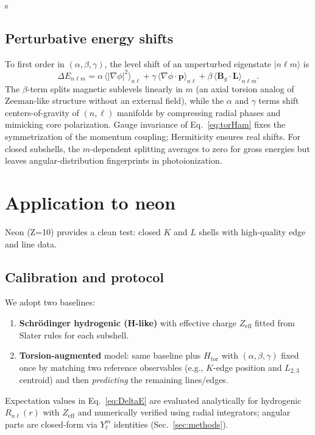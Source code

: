 s\documentclass[12pt]{article}
\begin{document}
\subsection{Perturbative energy shifts}
To first order in $(\alpha,\beta,\gamma)$, the level shift of an unperturbed eigenstate $\lvert n\ell m\rangle$ is
\begin{equation}
\Delta E_{n\ell m} = \alpha\,\big\langle |\nabla \phi|^2 \big\rangle_{n\ell}
+ \gamma\,\big\langle \nabla \phi \cdot \bm{p} \big\rangle_{n\ell}
+ \beta\,\big\langle \bm{B}_g\cdot \bm{L} \big\rangle_{n\ell m}.
\label{eq:DeltaE}
\end{equation}
The $\beta$-term splits magnetic sublevels linearly in $m$ (an axial torsion analog of Zeeman-like structure without an external field), while the $\alpha$ and $\gamma$ terms shift centers-of-gravity of $(n,\ell)$ manifolds by compressing radial phases and mimicking core polarization. Gauge invariance of Eq.~\eqref{eq:torHam} fixes the symmetrization of the momentum coupling; Hermiticity ensures real shifts. For closed subshells, the $m$-dependent splitting averages to zero for gross energies but leaves angular-distribution fingerprints in photoionization.

\section{Application to neon}
Neon (Z=10) provides a clean test: closed $K$ and $L$ shells with high-quality edge and line data.\cite{NISTXray,Chantler,KrauseOliver}

\subsection{Calibration and protocol}
We adopt two baselines:
\begin{enumerate}
\item \textbf{Schrödinger hydrogenic (H-like)} with effective charge $Z_{\mathrm{eff}}$ fitted from Slater rules for each subshell.\cite{Slater}
\item \textbf{Torsion-augmented} model: same baseline plus $H_{\mathrm{tor}}$ with $(\alpha,\beta,\gamma)$ fixed once by matching two reference observables (e.g., $K$-edge position and $L_{2,3}$ centroid) and then \emph{predicting} the remaining lines/edges.
\end{enumerate}
Expectation values in Eq.~\eqref{eq:DeltaE} are evaluated analytically for hydrogenic $R_{n\ell}(r)$ with $Z_{\mathrm{eff}}$ and numerically verified using radial integrators; angular parts are closed-form via $Y_\ell^m$ identities (Sec.~\ref{sec:methods}).
\end{document}
